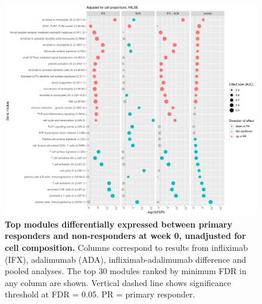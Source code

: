 
\begin{figure}
    \centering
    \includegraphics[width=1.0\textwidth,page=1]{mainmatter/figures/chapter_04/plot_gene_set_enrichment.tmodCERNO_panelplot_reversed_C_1RI_1NI,C_1RA_1NA,C_(1RI_1NI)_(1RA_1NA),C_1R_1N.cell_prop_correction_FALSE.pdf}
    \caption{
        \textbf{Top modules differentially expressed between primary responders and non-responders at week 0, unadjusted for cell composition.}
        Columns correspond to results from infliximab (IFX), adalimumab (ADA), infliximab-adalimumab difference and pooled analyses. 
        The top 30 modules ranked by minimum \gls{FDR} in any column are shown. Vertical dashed line shows significance threshold at FDR = 0.05.
        PR = primary responder.
    }
    \label{fig:multipants_dge_panelPlot_week_0_R_N_cellPropF}
\end{figure}

